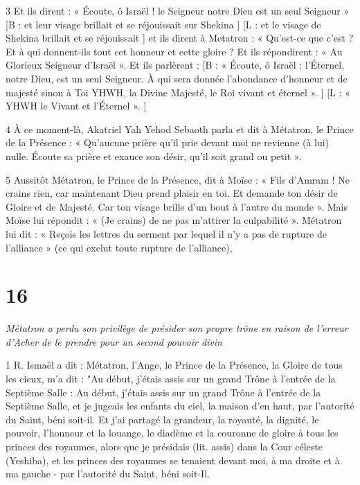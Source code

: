 \par 3 Et ils dirent : « Écoute, ô Israël ! le Seigneur notre Dieu est un seul Seigneur » [B : et leur visage brillait et se réjouissait sur Shekina ] [L : et le visage de Shekina brillait et se réjouissait ] et ils dirent à Metatron : « Qu'est-ce que c'est ? Et à qui donnent-ils tout cet honneur et cette gloire ? Et ils répondirent : « Au Glorieux Seigneur d’Israël ». Et ils parlèrent : [B : « Écoute, ô Israël : l’Éternel, notre Dieu, est un seul Seigneur. À qui sera donnée l’abondance d’honneur et de majesté sinon à Toi YHWH, la Divine Majesté, le Roi vivant et éternel ». ] [L : « YHWH le Vivant et l'Éternel ». ]

\par 4 À ce moment-là, Akatriel Yah Yehod Sebaoth parla et dit à Métatron, le Prince de la Présence : « Qu'aucune prière qu'il prie devant moi ne revienne (à lui) nulle. Écoute sa prière et exauce son désir, qu'il soit grand ou petit ».

\par 5 Aussitôt Métatron, le Prince de la Présence, dit à Moïse : « Fils d'Amram ! Ne crains rien, car maintenant Dieu prend plaisir en toi. Et demande ton désir de Gloire et de Majesté. Car ton visage brille d’un bout à l’autre du monde ». Mais Moïse lui répondit : « (Je crains) de ne pas m'attirer la culpabilité ». Métatron lui dit : « Reçois les lettres du serment par lequel il n'y a pas de rupture de l'alliance » (ce qui exclut toute rupture de l'alliance),

\chapter{16}

\par \textit{Métatron a perdu son privilège de présider son propre trône en raison de l'erreur d'Acher de le prendre pour un second pouvoir divin}

\par 1 R. Ismaël a dit : Métatron, l'Ange, le Prince de la Présence, la Gloire de tous les cieux, m'a dit : "Au début, j'étais assis sur un grand Trône à l'entrée de la Septième Salle : Au début, j'étais assis sur un grand Trône à l'entrée de la Septième Salle, et je jugeais les enfants du ciel, la maison d'en haut, par l'autorité du Saint, béni soit-il. Et j'ai partagé la grandeur, la royauté, la dignité, le pouvoir, l'honneur et la louange, le diadème et la couronne de gloire à tous les princes des royaumes, alors que je présidais (lit. assis) dans la Cour céleste (Yeshiba), et les princes des royaumes se tenaient devant moi, à ma droite et à ma gauche - par l'autorité du Saint, béni soit-Il.

